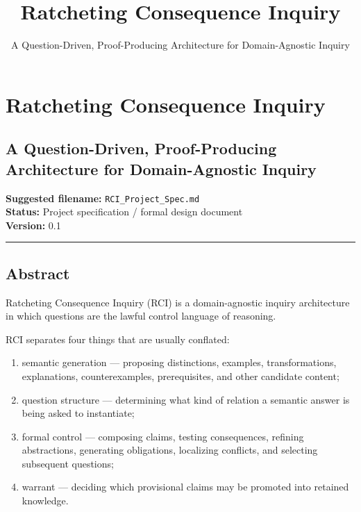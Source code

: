 \documentclass[
]{article}
\title{Ratcheting Consequence Inquiry}
\subtitle{A Question-Driven, Proof-Producing Architecture for
Domain-Agnostic Inquiry}
\author{}
\date{}
\providecommand{\tightlist}{%
  \setlength{\itemsep}{0pt}\setlength{\parskip}{0pt}}
\begin{document}
\maketitle

\section{Ratcheting Consequence
Inquiry}\label{ratcheting-consequence-inquiry}

\subsection{A Question-Driven, Proof-Producing Architecture for
Domain-Agnostic
Inquiry}\label{a-question-driven-proof-producing-architecture-for-domain-agnostic-inquiry}

\textbf{Suggested filename:} \texttt{RCI\_Project\_Spec.md}\\
\textbf{Status:} Project specification / formal design document\\
\textbf{Version:} 0.1

\begin{center}\rule{0.5\linewidth}{0.5pt}\end{center}

\subsection{Abstract}\label{abstract}

Ratcheting Consequence Inquiry (RCI) is a domain-agnostic inquiry
architecture in which questions are the lawful control language of
reasoning.

RCI separates four things that are usually conflated:

\begin{enumerate}
\def\labelenumi{\arabic{enumi}.}
\tightlist
\item
  semantic generation --- proposing distinctions, examples,
  transformations, explanations, counterexamples, prerequisites, and
  other candidate content;
\item
  question structure --- determining what kind of relation a semantic
  answer is being asked to instantiate;
\item
  formal control --- composing claims, testing consequences, refining
  abstractions, generating obligations, localizing conflicts, and
  selecting subsequent questions;
\item
  warrant --- deciding which provisional claims may be promoted into
  retained knowledge.
\end{enumerate}
\end{document}
